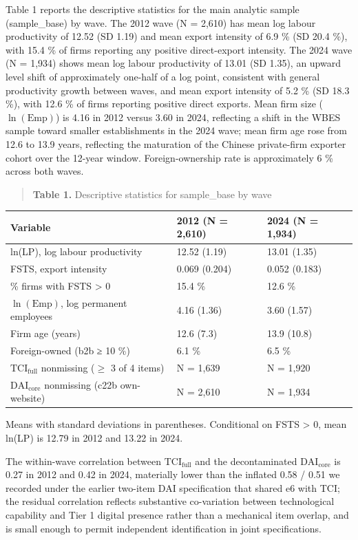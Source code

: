 \documentclass[12pt,a4paper]{article}
\begin{document}
Table 1 reports the descriptive statistics for the main analytic sample
(sample\_base) by wave. The 2012 wave (N = 2,610) has mean log labour
productivity of 12.52 (SD 1.19) and mean export intensity of 6.9 \% (SD
20.4 \%), with 15.4 \% of firms reporting any positive direct-export
intensity. The 2024 wave (N = 1,934) shows mean log labour productivity
of 13.01 (SD 1.35), an upward level shift of approximately one-half of a
log point, consistent with general productivity growth between waves,
and mean export intensity of 5.2 \% (SD 18.3 \%), with 12.6 \% of firms
reporting positive direct exports. Mean firm size
(\(\ln(\mathrm{Emp})\)) is 4.16 in 2012 versus 3.60 in 2024, reflecting
a shift in the WBES sample toward smaller establishments in the 2024
wave; mean firm age rose from 12.6 to 13.9 years, reflecting the
maturation of the Chinese private-firm exporter cohort over the 12-year
window. Foreign-ownership rate is approximately 6 \% across both waves.

\begin{quote}
\textbf{Table 1.} Descriptive statistics for sample\_base by wave
\end{quote}

\begin{longtable}[]{@{}lll@{}}
\toprule\noalign{}
Variable & 2012 (N = 2,610) & 2024 (N = 1,934) \\
\midrule\noalign{}
\endhead
\bottomrule\noalign{}
\endlastfoot
ln(LP), log labour productivity & 12.52 (1.19) & 13.01 (1.35) \\
FSTS, export intensity & 0.069 (0.204) & 0.052 (0.183) \\
\% firms with FSTS \textgreater{} 0 & 15.4 \% & 12.6 \% \\
\(\ln(\mathrm{Emp})\), log permanent employees & 4.16 (1.36) & 3.60
(1.57) \\
Firm age (years) & 12.6 (7.3) & 13.9 (10.8) \\
Foreign-owned (b2b ≥ 10 \%) & 6.1 \% & 6.5 \% \\
\(\mathrm{TCI}_{\text{full}}\) nonmissing (\(\geq\) 3 of 4 items) & N =
1,639 & N = 1,920 \\
\(\mathrm{DAI}_{\text{core}}\) nonmissing (c22b own-website) & N = 2,610
& N = 1,934 \\
\end{longtable}

Means with standard deviations in parentheses. Conditional on FSTS
\textgreater{} 0, mean ln(LP) is 12.79 in 2012 and 13.22 in 2024.

The within-wave correlation between \(\mathrm{TCI}_{\text{full}}\) and
the decontaminated \(\mathrm{DAI}_{\text{core}}\) is 0.27 in 2012 and
0.42 in 2024, materially lower than the inflated 0.58 / 0.51 we recorded
under the earlier two-item DAI specification that shared e6 with TCI;
the residual correlation reflects substantive co-variation between
technological capability and Tier 1 digital presence rather than a
mechanical item overlap, and is small enough to permit independent
identification in joint specifications.
\end{document}
